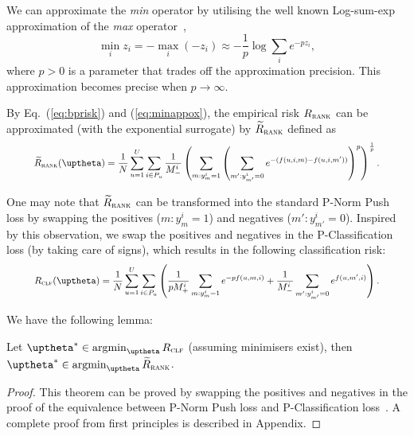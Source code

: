 We can approximate the \emph{min} operator by utilising the well known Log-sum-exp approximation 
of the \emph{max} operator~\cite[p. 72]{boyd2004convex},
\begin{equation}
\label{eq:minappox}
\min_i z_i = -\max_i (-z_i) \approx -\frac{1}{p} \log \sum_i e^{-p z_i},
\end{equation}
where $p > 0$ is a parameter that trades off the approximation precision.
This approximation becomes precise when $p \to \infty$.

By Eq.~(\ref{eq:bprisk}) and (\ref{eq:minappox}), the empirical risk $R_\textsc{rank}$ can be approximated
(with the exponential surrogate) by $\widetilde R_\textsc{rank}$ defined as
\begin{equation}
\label{eq:rankapprox}
\resizebox{.9\linewidth}{!}{$
\begin{aligned}
\widetilde R_\textsc{rank}(\uptheta)
= \frac{1}{N} \sum_{u=1}^U \sum_{i \in P_u} \frac{1}{M_-^i} \left( \sum_{m: y_m^i = 1} \left( \sum_{m': y_{m'}^i = 0} 
  e^{-(f(u, i, m) - f(u, i, m'))} \right)^p \right)^\frac{1}{p}.
\end{aligned}
$}
\end{equation}


One may note that $\widetilde R_\textsc{rank}$ can be transformed into the standard P-Norm Push loss by swapping the
positives ($m: y_m^i = 1$) and negatives ($m': y_{m'}^i = 0$). %
Inspired by this observation, we swap the positives and negatives in the P-Classification loss (by taking care of signs),
which results in the following classification risk:
\begin{equation}
\label{eq:clfrisk}
\resizebox{.9\linewidth}{!}{$\displaystyle
R_\textsc{clf}(\uptheta)
= \frac{1}{N} \sum_{u=1}^U \sum_{i \in P_u} \left(
  \frac{1}{p M_+^i} \sum_{m: y_m^i = 1} e^{-p f(u, m, i)}
  + \frac{1}{M_-^i} \sum_{m': y_{m'}^i = 0} e^{f(u, m', i)} \right).
$}
\end{equation}

We have the following lemma:
\begin{lemma}
\label{lm:rank2clf}
Let $\uptheta^* \in \argmin_{\uptheta} R_\textsc{clf}$ (assuming minimisers exist),
then $\uptheta^* \in \argmin_{\uptheta} \widetilde R_\textsc{rank}$.
\end{lemma}

\begin{proof}
This theorem can be proved by swapping the positives and negatives in the proof of 
the equivalence between P-Norm Push loss and P-Classification loss~\cite{ertekin2011equivalence}.
A complete proof from first principles is described in Appendix.
\end{proof}

